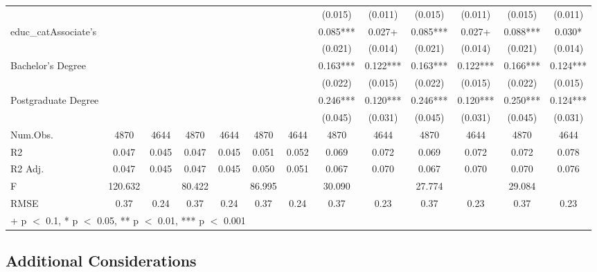 \documentclass[
]{article}
\begin{document}
\begin{table}
{\begin{tabular}[t]{lcccccccccccc}
 &  &  &  &  &  &  & (\num{0.015}) & (\num{0.011}) & (\num{0.015}) & (\num{0.011}) & (\num{0.015}) & (\num{0.011})\\
educ\_catAssociate's &  &  &  &  &  &  & \num{0.085}*** & \num{0.027}+ & \num{0.085}*** & \num{0.027}+ & \num{0.088}*** & \num{0.030}*\\
 &  &  &  &  &  &  & (\num{0.021}) & (\num{0.014}) & (\num{0.021}) & (\num{0.014}) & (\num{0.021}) & (\num{0.014})\\
Bachelor's Degree &  &  &  &  &  &  & \num{0.163}*** & \num{0.122}*** & \num{0.163}*** & \num{0.122}*** & \num{0.166}*** & \num{0.124}***\\
 &  &  &  &  &  &  & (\num{0.022}) & (\num{0.015}) & (\num{0.022}) & (\num{0.015}) & (\num{0.022}) & (\num{0.015})\\
Postgraduate Degree &  &  &  &  &  &  & \num{0.246}*** & \num{0.120}*** & \num{0.246}*** & \num{0.120}*** & \num{0.250}*** & \num{0.124}***\\
 &  &  &  &  &  &  & (\num{0.045}) & (\num{0.031}) & (\num{0.045}) & (\num{0.031}) & (\num{0.045}) & (\num{0.031})\\
\midrule
Num.Obs. & \num{4870} & \num{4644} & \num{4870} & \num{4644} & \num{4870} & \num{4644} & \num{4870} & \num{4644} & \num{4870} & \num{4644} & \num{4870} & \num{4644}\\
R2 & \num{0.047} & \num{0.045} & \num{0.047} & \num{0.045} & \num{0.051} & \num{0.052} & \num{0.069} & \num{0.072} & \num{0.069} & \num{0.072} & \num{0.072} & \num{0.078}\\
R2 Adj. & \num{0.047} & \num{0.045} & \num{0.047} & \num{0.045} & \num{0.050} & \num{0.051} & \num{0.067} & \num{0.070} & \num{0.067} & \num{0.070} & \num{0.070} & \num{0.076}\\
F & \num{120.632} &  & \num{80.422} &  & \num{86.995} &  & \num{30.090} &  & \num{27.774} &  & \num{29.084} & \\
RMSE & \num{0.37} & \num{0.24} & \num{0.37} & \num{0.24} & \num{0.37} & \num{0.24} & \num{0.37} & \num{0.23} & \num{0.37} & \num{0.23} & \num{0.37} & \num{0.23}\\
\bottomrule
\multicolumn{13}{l}{\rule{0pt}{1em}+ p $<$ 0.1, * p $<$ 0.05, ** p $<$ 0.01, *** p $<$ 0.001}\\
\end{tabular}}
\end{table}

\subsection{Additional Considerations}\label{additional-considerations}
\end{document}
